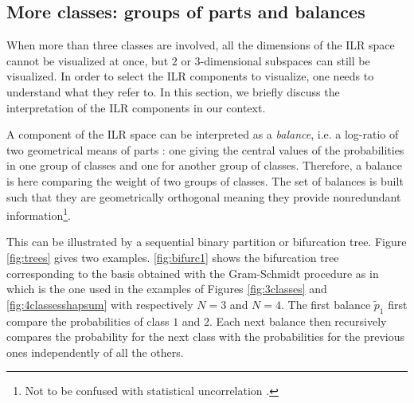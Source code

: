 \documentclass{article}
\theoremstyle{plain}
\theoremstyle{definition}
\theoremstyle{remark}
\begin{document}
\subsection{More classes: groups of parts and balances}
\label{sec:balances}

When more than three classes are involved, all the dimensions of the ILR space cannot be visualized at once, but $2$ or $3$-dimensional subspaces can still be visualized. In order to select the ILR components to visualize, one needs to understand what they refer to. In this section, we briefly discuss the interpretation of the ILR components in our context.%

A component of the ILR space  can be interpreted as a \emph{balance}, i.e. a log-ratio of two geometrical means of parts \cite{egozcue2003isometric,egozcue2005groups,pawlowskymodeling}: one giving the central values of the probabilities in one group of classes and one for another group of classes. Therefore, a balance is here comparing the weight of two groups of classes. The set of balances is built such that they are geometrically orthogonal meaning they provide nonredundant information\footnote{Not to be confused with statistical uncorrelation \cite{pawlowskymodeling}.}.

This can be illustrated by a sequential binary partition or bifurcation tree. Figure \ref{fig:trees} gives two examples. \ref{fig:bifurc1} shows the bifurcation tree corresponding to the basis obtained with the Gram-Schmidt procedure as in \cite{egozcue2003isometric} which is the one used in the examples of Figures \ref{fig:3classes} and \ref{fig:4classesshapsum}  with respectively $N=3$ and $N=4$. The first balance $\tilde{p}_1$ first compare the probabilities of class $1$ and $2$. Each next balance then recursively compares the probability for the next class with the probabilities for the previous ones independently of all the others.
\end{document}

